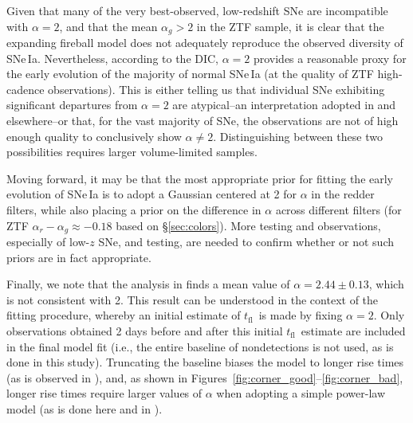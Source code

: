 \documentclass[twocolumn]{./aastex63}
\newcommand{\tfl}{$t_\mathrm{fl}$}
\begin{document}
Given that many of the very best-observed, low-redshift SNe are incompatible
with $\alpha = 2$, and that the mean $\alpha_g > 2$ in the ZTF sample, it is
clear that the expanding fireball model does not adequately reproduce the
observed diversity of SNe\,Ia. Nevertheless, according to the
DIC, $\alpha=2$ provides a reasonable proxy for the early evolution of the
majority of normal SNe\,Ia (at the quality of ZTF high-cadence observations).
This is either telling us that individual SNe exhibiting significant
departures from $\alpha = 2$ are atypical--an interpretation adopted in
\citealt{Hosseinzadeh17,Miller18,Dimitriadis19} and elsewhere--or that, for
the vast majority of SNe, the observations are not of high enough quality to
conclusively show $\alpha \neq 2$. Distinguishing between these two
possibilities requires larger volume-limited samples.

Moving forward, it may be that the most appropriate prior for fitting the
early evolution of SNe\,Ia is to adopt a Gaussian centered at 2 for $\alpha$
in the redder filters, while also placing a prior on the difference in
$\alpha$ across different filters (for ZTF $\alpha_r - \alpha_g \approx -0.18$
based on \S\ref{sec:colors}). More testing and observations, especially of
low-$z$ SNe, and testing, are needed to confirm whether or not such priors are
in fact appropriate.

Finally, we note that the analysis in \citet{Firth15} finds a mean value of
$\alpha = 2.44 \pm 0.13$, which is not consistent with 2. This result can be
understood in the context of the \citet{Firth15} fitting procedure, whereby an
initial estimate of \tfl\ is made by fixing $\alpha = 2$. Only observations
obtained 2 days before and after this initial \tfl\ estimate are included in
the final model fit (i.e., the entire baseline of nondetections is not used,
as is done in this study). Truncating the baseline biases the model to longer
rise times (as is observed in \citet{Firth15}), and, as shown in
Figures~\ref{fig:corner_good}--\ref{fig:corner_bad}, longer rise times require
larger values of $\alpha$ when adopting a simple power-law model (as is done
here and in \citet{Firth15}).
\end{document}
